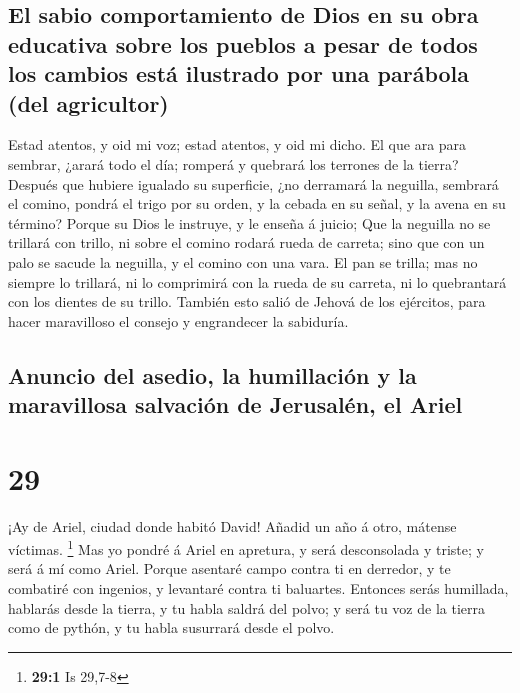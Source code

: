 \hypertarget{el-sabio-comportamiento-de-dios-en-su-obra-educativa-sobre-los-pueblos-a-pesar-de-todos-los-cambios-estuxe1-ilustrado-por-una-paruxe1bola-del-agricultor}{%
\subsection{El sabio comportamiento de Dios en su obra educativa sobre
los pueblos a pesar de todos los cambios está ilustrado por una parábola
(del
agricultor)}\label{el-sabio-comportamiento-de-dios-en-su-obra-educativa-sobre-los-pueblos-a-pesar-de-todos-los-cambios-estuxe1-ilustrado-por-una-paruxe1bola-del-agricultor}}

 Estad atentos, y oid mi voz; estad atentos, y oid mi
dicho.  El que ara para sembrar, ¿arará todo el día;
romperá y quebrará los terrones de la tierra?  Después
que hubiere igualado su superficie, ¿no derramará la neguilla, sembrará
el comino, pondrá el trigo por su orden, y la cebada en su señal, y la
avena en su término?  Porque su Dios le instruye, y le
enseña á juicio;  Que la neguilla no se trillará con
trillo, ni sobre el comino rodará rueda de carreta; sino que con un palo
se sacude la neguilla, y el comino con una vara.  El pan
se trilla; mas no siempre lo trillará, ni lo comprimirá con la rueda de
su carreta, ni lo quebrantará con los dientes de su trillo.
 También esto salió de Jehová de los ejércitos, para
hacer maravilloso el consejo y engrandecer la sabiduría.

\hypertarget{anuncio-del-asedio-la-humillaciuxf3n-y-la-maravillosa-salvaciuxf3n-de-jerusaluxe9n-el-ariel}{%
\subsection{Anuncio del asedio, la humillación y la maravillosa
salvación de Jerusalén, el
Ariel}\label{anuncio-del-asedio-la-humillaciuxf3n-y-la-maravillosa-salvaciuxf3n-de-jerusaluxe9n-el-ariel}}

\hypertarget{section-28}{%
\section{29}\label{section-28}}

 ¡Ay de Ariel, ciudad donde habitó David! Añadid un año á
otro, mátense víctimas. \footnote{\textbf{29:1} Is 29,7-8}
 Mas yo pondré á Ariel en apretura, y será desconsolada y
triste; y será á mí como Ariel.  Porque asentaré campo
contra ti en derredor, y te combatiré con ingenios, y levantaré contra
ti baluartes.  Entonces serás humillada, hablarás desde la
tierra, y tu habla saldrá del polvo; y será tu voz de la tierra como de
pythón, y tu habla susurrará desde el polvo.

